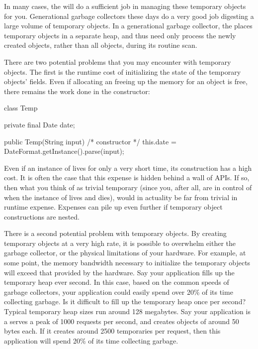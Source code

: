 
In many cases, the \jre will do a sufficient job in managing these temporary
objects for you. Generational garbage collectors  these days do a very good job digesting a large volume of temporary
objects. In a generational garbage collector, the \jre places temporary objects
in a separate heap, and thus need only process the newly created objects, rather
than all objects, during its routine scan.

There are two potential problems that you may encounter with temporary objects.
The first is the runtime cost of initializing the state of the temporary
objects' fields. Even if allocating an freeing up the memory for an object is
free, there remains the work done in the constructor:

\begin{shortlisting}
class Temp {
	private final Date date;
	
	public Temp(String input) { /* constructor */
		this.date = DateFormat.getInstance().parse(input);
	}
}
\end{shortlisting}

Even if an instance of  lives for only a very short time, its
construction has a high cost. It is often the case that this expense is hidden
behind a wall of APIs. If so, then what you think of as trivial temporary (since
you, after all, are in control of when the instance of  lives and
dies), would in actuality be far from trivial in runtime expense. Expenses can
pile up even further if temporary object constructions are nested.

There is a second potential problem with temporary objects. By creating temporary
objects at a very high rate, it is possible to overwhelm either the garbage
collector, or the physical limitations of your hardware. For example, at some
point, the memory bandwidth necessary to initialize the temporary objects will
exceed that provided by the hardware. Say your application fills up the temporary
heap ever second. In this case, based on the common speeds of garbage collectors,
your application could easily
 spend over 20\% of its time collecting garbage. Is it difficult to fill up the
 temporary heap once per second? Typical temporary heap sizes run around 128
 megabytes. Say your application is a serves a peak of 1000 requests per second,
 and creates objects of around 50 bytes each. If it creates around 2500
 temporaries per request, then this application will spend 20\% of its time
 collecting garbage.


